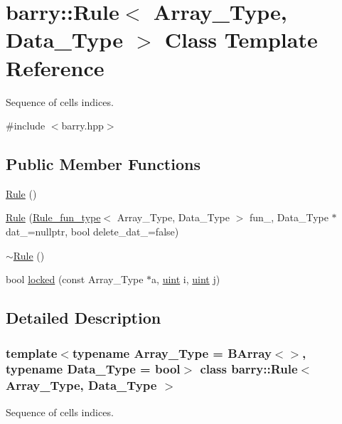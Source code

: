 \hypertarget{classbarry_1_1_rule}{}\section{barry\+:\+:Rule$<$ Array\+\_\+\+Type, Data\+\_\+\+Type $>$ Class Template Reference}
\label{classbarry_1_1_rule}


Sequence of cells indices.  




{\ttfamily \#include $<$barry.\+hpp$>$}

\subsection*{Public Member Functions}
\begin{DoxyCompactItemize}
\item 
\hyperlink{classbarry_1_1_rule_aa9d79df22874f000c8f4dd46b58cc157}{Rule} ()
\item 
\hyperlink{classbarry_1_1_rule_a2d63309b0ff8cd5d2c4827b9daf03b3a}{Rule} (\hyperlink{namespacebarry_aefd7e6d4ba228e2ce1074d075c512178}{Rule\+\_\+fun\+\_\+type}$<$ Array\+\_\+\+Type, Data\+\_\+\+Type $>$ fun\+\_\+, Data\+\_\+\+Type $\ast$dat\+\_\+=nullptr, bool delete\+\_\+dat\+\_\+=false)
\item 
\hyperlink{classbarry_1_1_rule_a5b56209f553a6fe5b841395eec8e3101}{$\sim$\+Rule} ()
\item 
bool \hyperlink{classbarry_1_1_rule_a0a9a115c6951a5c8de699d4ff9f69060}{locked} (const Array\+\_\+\+Type $\ast$a, \hyperlink{namespacebarry_a11dfc53ddb4672278319aa04f1e09a6c}{uint} i, \hyperlink{namespacebarry_a11dfc53ddb4672278319aa04f1e09a6c}{uint} j)
\end{DoxyCompactItemize}


\subsection{Detailed Description}
\subsubsection*{template$<$typename Array\+\_\+\+Type = B\+Array$<$$>$, typename Data\+\_\+\+Type = bool$>$\newline
class barry\+::\+Rule$<$ Array\+\_\+\+Type, Data\+\_\+\+Type $>$}

Sequence of cells indices. 




